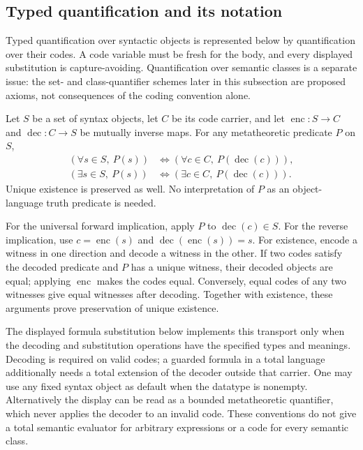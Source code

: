 \subsection{Typed quantification and its notation}
Typed quantification over syntactic objects is represented below by
quantification over their codes. A code variable must be fresh for the body,
and every displayed substitution is capture-avoiding. Quantification over
semantic classes is a separate issue: the set- and class-quantifier schemes
later in this subsection are proposed axioms, not consequences of the
coding convention alone.
\begin{proposition}
Let $S$ be a set of syntax objects, let $C$ be its code carrier, and let
$\operatorname{enc}:S\to C$ and $\operatorname{dec}:C\to S$ be mutually
inverse maps. For any metatheoretic predicate $P$ on $S$,
\[
\begin{aligned}
(\forall s\in S,\ P(s))
 &\iff(\forall c\in C,\ P(\operatorname{dec}(c))),\\
(\exists s\in S,\ P(s))
 &\iff(\exists c\in C,\ P(\operatorname{dec}(c))).
\end{aligned}
\]
Unique existence is preserved as well. No interpretation of $P$ as an
object-language truth predicate is needed.
\end{proposition}
\Proof
For the universal forward implication, apply $P$ to
$\operatorname{dec}(c)\in S$. For the reverse implication, use
$c=\operatorname{enc}(s)$ and
$\operatorname{dec}(\operatorname{enc}(s))=s$. For existence, encode
a witness in one direction and decode a witness in the other.
If two codes satisfy the decoded predicate and $P$ has a unique
witness, their decoded objects are equal; applying $\operatorname{enc}$
makes the codes equal. Conversely, equal codes of any two witnesses
give equal witnesses after decoding. Together with existence, these
arguments prove preservation of unique existence.
\Done

The displayed formula substitution below implements this transport only
when the decoding and substitution operations have the specified types
and meanings. Decoding is required on valid codes; a guarded formula
in a total language additionally needs a total extension of the decoder
outside that carrier. One may use any fixed syntax object as default
when the datatype is nonempty. Alternatively the display can be read as
a bounded metatheoretic quantifier, which never applies the decoder to
an invalid code. These conventions do not give a total semantic evaluator
for arbitrary expressions or a code for every semantic class.

